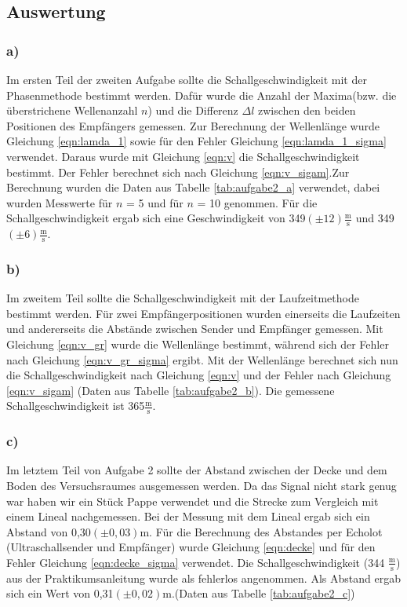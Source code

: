 \documentclass[12pt]{scrartcl}
\begin{document}
\subsection{Auswertung}
\subsubsection{a)}
Im ersten Teil der zweiten Aufgabe sollte die Schallgeschwindigkeit mit der Phasenmethode bestimmt werden. Dafür wurde die Anzahl der Maxima(bzw. die überstrichene Wellenanzahl $n$) und die Differenz $\Delta l$ zwischen den beiden Positionen des Empfängers gemessen. Zur Berechnung der Wellenlänge wurde Gleichung \ref{eqn:lamda_1} sowie für den Fehler Gleichung \ref{eqn:lamda_1_sigma} verwendet. Daraus wurde mit Gleichung \ref{eqn:v} die Schallgeschwindigkeit bestimmt. Der Fehler berechnet sich nach Gleichung \ref{eqn:v_sigam}.Zur Berechnung wurden die Daten aus Tabelle \ref{tab:aufgabe2_a} verwendet, dabei wurden Messwerte für $n$ = 5 und für $n$ = 10 genommen. Für die Schallgeschwindigkeit ergab sich eine Geschwindigkeit von 349$(\pm 12) \frac{\text{m}}{\text{s}}$  und 349$(\pm 6) \frac{\text{m}}{\text{s}}$.

\subsubsection{b)}
Im zweitem Teil sollte die Schallgeschwindigkeit mit der Laufzeitmethode bestimmt werden. Für zwei Empfängerpositionen wurden einerseits die Laufzeiten und andererseits die Abstände zwischen Sender und Empfänger gemessen. Mit Gleichung \ref{eqn:v_gr} wurde die Wellenlänge bestimmt, während sich der Fehler nach Gleichung \ref{eqn:v_gr_sigma} ergibt. Mit der Wellenlänge berechnet sich nun die Schallgeschwindigkeit nach Gleichung \ref{eqn:v} und der Fehler nach Gleichung \ref{eqn:v_sigam} (Daten aus Tabelle \ref{tab:aufgabe2_b}). Die gemessene Schallgeschwindigkeit ist 365$\frac{\text{m}}{\text{s}}$.

\subsubsection{c)}
Im letztem Teil von Aufgabe 2 sollte der Abstand zwischen der Decke und dem Boden des Versuchsraumes ausgemessen werden. Da das Signal nicht stark genug war haben wir ein Stück Pappe verwendet und die Strecke zum Vergleich mit einem Lineal nachgemessen. Bei der Messung mit dem Lineal ergab sich ein Abstand von 0,30$(\pm 0,03)$m. Für die Berechnung des Abstandes per Echolot (Ultraschallsender und Empfänger) wurde Gleichung \ref{eqn:decke} und für den Fehler Gleichung \ref{eqn:decke_sigma} verwendet.
Die Schallgeschwindigkeit (344 $\frac{\text{m}}{\text{s}}$) aus der Praktikumsanleitung wurde als fehlerlos angenommen. Als Abstand ergab sich ein Wert von 0,31$(\pm 0,02)$m.(Daten aus Tabelle \ref{tab:aufgabe2_c})
\end{document}

